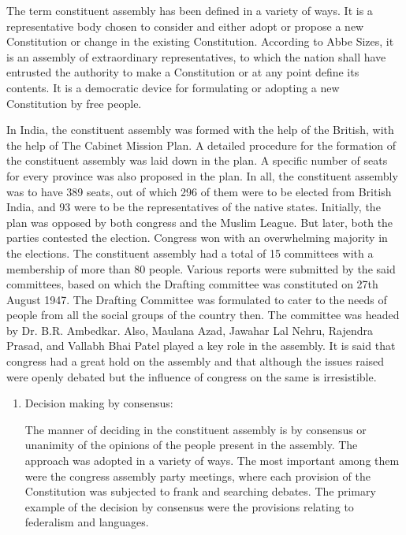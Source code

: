 \begin{multicols}{2}
\noi
The term constituent assembly has been defined in a variety of ways. It is a representative body chosen to consider and either adopt or propose a new Constitution or change in the existing Constitution. According to Abbe Sizes, it is an assembly of extraordinary representatives, to which the nation shall have entrusted the authority to make a Constitution or at any point define its contents. It is a democratic device for formulating or adopting a new Constitution by free people.

\noi
In India, the constituent assembly was formed with the help of the British, with the help of The Cabinet Mission Plan. A detailed procedure for the formation of the constituent assembly was laid down in the plan. A specific number of seats for every province was also proposed in the plan. In all, the constituent assembly was to have 389 seats, out of which 296 of them were to be elected from British India, and 93 were to be the representatives of the native states. Initially, the plan was opposed by both congress and the Muslim League. But later, both the parties contested the election. Congress won with an overwhelming majority in the elections. The constituent assembly had a total of 15 committees with a membership of more than 80 people. Various reports were submitted by the said committees, based on which the Drafting committee was constituted on 27th August 1947. The Drafting Committee was formulated to cater to the needs of people from all the social groups of the country then. The committee was headed by Dr. B.R. Ambedkar. Also, Maulana Azad, Jawahar Lal Nehru, Rajendra Prasad, and Vallabh Bhai Patel played a key role in the assembly. It is said that congress had a great hold on the assembly and that although the issues raised were openly debated but the influence of congress on the same is irresistible.


\begin{enumerate}
\item Decision making by consensus:

\noi
The manner of deciding in the constituent assembly is by consensus or unanimity of the opinions of the people present in the assembly. The approach was adopted in a variety of ways. The most important among them were the congress assembly party meetings, where each provision of the Constitution was subjected to frank and searching debates. The primary example of the decision by consensus were the provisions relating to federalism and languages.


\end{enumerate}
\end{multicols}
